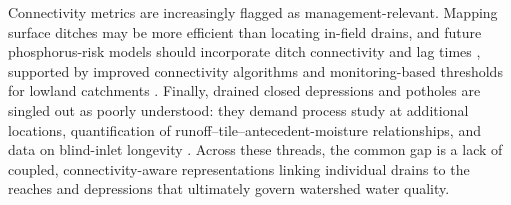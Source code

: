 Connectivity metrics are increasingly flagged as management-relevant. Mapping
surface ditches may be more efficient than locating in-field drains, and future
phosphorus-risk models should incorporate ditch connectivity and lag times
\parencite{Moloney2020,Opoku2024}, supported by improved connectivity
algorithms and monitoring-based thresholds for lowland catchments
\parencite{Calsamiglia2018}. Finally, drained closed depressions and potholes
are singled out as poorly understood: they demand process study at additional
locations, quantification of runoff--tile--antecedent-moisture relationships,
and data on blind-inlet longevity
\parencite{Martin2019,Williams2020,Feyereisen2015b}. Across these threads, the
common gap is a lack of coupled, connectivity-aware representations linking
individual drains to the reaches and depressions that ultimately govern
watershed water quality.